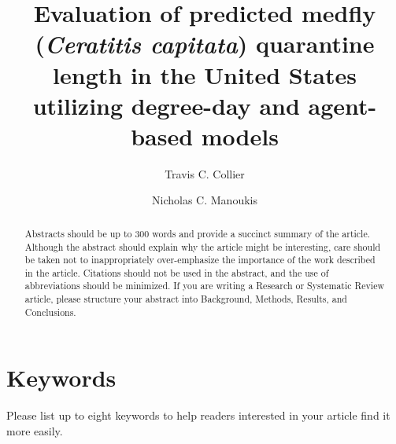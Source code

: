 \documentclass[10pt,a4paper,twocolumn]{article}
\begin{document}
\title{Evaluation of predicted medfly (\textit{Ceratitis capitata}) quarantine length in the United States utilizing degree-day and agent-based models}

\author[1,2]{Travis C. Collier}
\author[1,3]{Nicholas C. Manoukis}

\maketitle
\thispagestyle{fancy}

\begin{abstract}

Abstracts should be up to 300 words and provide a succinct summary of the article. Although the abstract should explain why the article might be interesting, care should be taken not to inappropriately over-emphasize the importance of the work described in the article. Citations should not be used in the abstract, and the use of abbreviations should be minimized. If you are writing a Research or Systematic Review article, please structure your abstract into Background, Methods, Results, and Conclusions.
\end{abstract}

\section*{Keywords}

Please list up to eight keywords to help readers interested in your article find it more easily.

\clearpage
\end{document}
